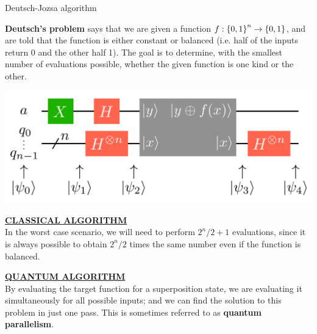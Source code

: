 \documentclass[9pt, handout, aspectratio=169]{beamer}	%
\begin{document}

\begin{frame}[allowframebreaks]{Deutsch-Jozsa algorithm}

	\vspace{-0.5em}
	\begin{multicols}{2}

		\textbf{Deutsch’s problem} says that we are given a function $f: \qty{0,1}^n \rightarrow \qty{0,1}$, and are told that the function is either constant or balanced (i.e. half of the inputs return 0 and the other half 1). The goal is to determine, with the smallest number of evaluations possible, whether the given function is one kind or the other.

		\columnbreak

		\begin{center}
			\includegraphics[width=.40\paperwidth]{Figures/quantum-background/deutsch-jozsa-algorithm}
		\end{center}

	\end{multicols}

	\begin{multicols}{2}

		\underline{\textbf{CLASSICAL ALGORITHM}} \\[5pt]
		In the worst case scenario, we will need to perform $2^n/2+1$ evaluations, since it is always possible to obtain $2^n/2$ times the same number even if the function is balanced.

		\columnbreak

		\underline{\textbf{QUANTUM ALGORITHM}} \\[5pt]
		By evaluating the target function for a superposition state, we are evaluating it simultaneously for all possible inputs; and we can find the solution to this problem in just one pass. This is sometimes referred to as \textbf{quantum parallelism}.

	\end{multicols}


\end{frame}
\end{document}
